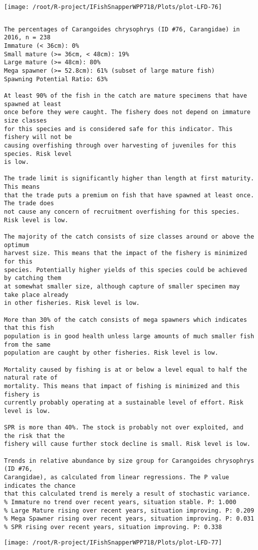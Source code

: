 \documentclass{report}\usepackage[]{graphicx}\usepackage[]{color}
\makeatletter
\def\maxwidth{ %
  \ifdim\Gin@nat@width>\linewidth
    \linewidth
  \else
    \Gin@nat@width
  \fi
}
\newenvironment{kframe}{%
 \def\at@end@of@kframe{}%
 \ifinner\ifhmode%
  \def\at@end@of@kframe{\end{minipage}}%
  \begin{minipage}{\columnwidth}%
 \fi\fi%
 \def\FrameCommand##1{\hskip\@totalleftmargin \hskip-\fboxsep
 \colorbox{shadecolor}{##1}\hskip-\fboxsep
     \hskip-\linewidth \hskip-\@totalleftmargin \hskip\columnwidth}%
 \MakeFramed {\advance\hsize-\width
   \@totalleftmargin\z@ \linewidth\hsize
   \@setminipage}}%
 {\par\unskip\endMakeFramed%
 \at@end@of@kframe}
\newenvironment{knitrout}{}{} %
\makeatother
\begin{document}
\begin{knitrout}
\texttt{[image: /root/R-project/IFishSnapperWPP718/Plots/plot-LFD-76]} 
\begin{kframe}\begin{verbatim}
\end{verbatim}
\end{kframe}
\clearpage
\newpage
\begin{kframe}\begin{verbatim}The percentages of Carangoides chrysophrys (ID #76, Carangidae) in 2016, n = 238
Immature (< 36cm): 0%
Small mature (>= 36cm, < 48cm): 19%
Large mature (>= 48cm): 80%
Mega spawner (>= 52.8cm): 61% (subset of large mature fish)
Spawning Potential Ratio: 63%
 
At least 90% of the fish in the catch are mature specimens that have spawned at least
once before they were caught. The fishery does not depend on immature size classes
for this species and is considered safe for this indicator. This fishery will not be
causing overfishing through over harvesting of juveniles for this species. Risk level
is low.

The trade limit is significantly higher than length at first maturity.  This means
that the trade puts a premium on fish that have spawned at least once. The trade does
not cause any concern of recruitment overfishing for this species. Risk level is low.

The majority of the catch consists of size classes around or above the optimum
harvest size. This means that the impact of the fishery is minimized for this
species. Potentially higher yields of this species could be achieved by catching them
at somewhat smaller size, although capture of smaller specimen may take place already
in other fisheries. Risk level is low.

More than 30% of the catch consists of mega spawners which indicates that this fish
population is in good health unless large amounts of much smaller fish from the same
population are caught by other fisheries. Risk level is low.
 
Mortality caused by fishing is at or below a level equal to half the natural rate of
mortality. This means that impact of fishing is minimized and this fishery is
currently probably operating at a sustainable level of effort. Risk level is low.
 
SPR is more than 40%. The stock is probably not over exploited, and the risk that the
fishery will cause further stock decline is small. Risk level is low.
 
Trends in relative abundance by size group for Carangoides chrysophrys (ID #76,
Carangidae), as calculated from linear regressions. The P value indicates the chance
that this calculated trend is merely a result of stochastic variance.
% Immature no trend over recent years, situation stable. P: 1.000
% Large Mature rising over recent years, situation improving. P: 0.209
% Mega Spawner rising over recent years, situation improving. P: 0.031
% SPR rising over recent years, situation improving. P: 0.338
\end{verbatim}
\end{kframe}
\texttt{[image: /root/R-project/IFishSnapperWPP718/Plots/plot-LFD-77]} 


\end{knitrout}
\end{document}
